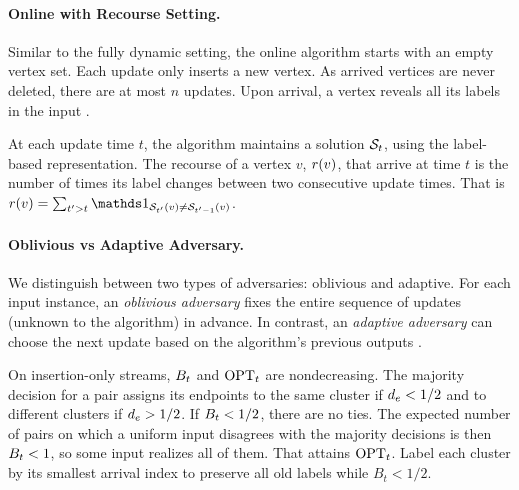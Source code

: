 

\paragraph{Online with Recourse Setting.}\label{par:online_with_recourse_setting_} %
Similar to the fully dynamic setting, the online algorithm starts with an empty vertex set.
Each update only inserts a new vertex.
As arrived vertices are never deleted, there are at most $ n $ updates.
Upon arrival, a vertex reveals all its labels in the input \clusterings.

At each update time $ t $, the algorithm maintains a \clustering solution $ \outcls{t} $, using the label-based representation.
The recourse of a vertex $ v $, $ \recourse{v} $, that arrive at time $ t $ is the number of times its label changes between two consecutive update times.
That is $ \recourse{v} = \sum_{t' > t} \idc{\outcls{t'}(v) \neq \outcls{t'-1}(v)} $.

\paragraph{Oblivious vs Adaptive Adversary.}\label{par:oblivious_vs_adaptive_adversaty} %
We distinguish between two types of adversaries: oblivious and adaptive.
For each input instance, an \emph{oblivious adversary} fixes the entire sequence of updates (unknown to the algorithm) in advance.
In contrast, an \emph{adaptive adversary} can choose the next update based on the algorithm's previous outputs .




On insertion-only streams, $\summweight{t}$ and $\operatorname{OPT}_t$ are nondecreasing. The
majority decision for a pair assigns its endpoints to the same cluster
if $\weight{e}<1/2$ and to different clusters if $\weight{e}>1/2$. If $\summweight{t}<1/2$, there are no ties. The expected number of
pairs on which a uniform input disagrees with the majority decisions
is then $\summweight{t}<1$, so some input realizes all of them. That \clustering
attains $\operatorname{OPT}_t$. Label each cluster by its smallest arrival index to
preserve all old labels while $B_t<1/2$.



